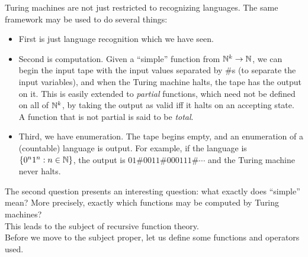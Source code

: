 	Turing machines are not just restricted to recognizing languages. The same framework may be used to do several things:
	\begin{itemize}
		\item First is just language recognition which we have seen.
		\item Second is computation. Given a ``simple'' function from $\mathbb{N}^k \to \mathbb{N}$, we can begin the input tape with the input values separated by $\#$s (to separate the input variables), and when the Turing machine halts, the tape has the output on it. This is easily extended to \emph{partial} functions, which need not be defined on all of $\mathbb{N}^k$, by taking the output as valid iff it halts on an accepting state. A function that is not partial is said to be \emph{total}.
		\item Third, we have enumeration. The tape begins empty, and an enumeration of a (countable) language is output. For example, if the language is $\{0^n1^n : n \in \mathbb{N}\}$, the output is $01\#0011\#000111\#\cdots$ and the Turing machine never halts.
	\end{itemize}

	The second question presents an interesting question: what exactly does ``simple'' mean? More precisely, exactly which functions may be computed by Turing machines?\\

	This leads to the subject of recursive function theory.\\
	Before we move to the subject proper, let us define some functions and operators used.


